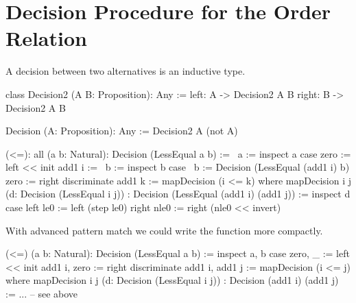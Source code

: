 \vskip 5mm
\section{Decision Procedure for the Order Relation}



A decision between two alternatives is an inductive type.

\begin{alba}
    class Decision2 (A B: Proposition): Any :=
        left: A  -> Decision2 A B
        right: B -> Decision2 A B

    Decision (A: Proposition): Any :=
        Decision2 A (not A)
\end{alba}



\begin{alba}
    (<=): all (a b: Natural): Decision (LessEqual a b) :=
        \ a :=
            inspect a case
                zero :=
                    left << init
                add1 i :=
                    \ b :=
                        inspect b case
                            {\ b := Decision (LessEqual (add1 i) b)}
                            zero :=
                                right discriminate
                            add1 k :=
                                mapDecision (i <= k)
        where
            mapDecision
                {i j} (d: Decision (LessEqual i j))
                : Decision (LessEqual (add1 i) (add1 j))
            :=
                inspect d case
                    left le0 :=
                        left (step le0)
                    right nle0 :=
                        right (nle0 << invert)
\end{alba}

With advanced pattern match we could write the function more compactly.

\begin{alba}
    (<=) (a b: Natural): Decision (LessEqual a b) :=
        inspect
            a, b
        case
            zero, _ :=
                left << init
            add1 i, zero :=
                right discriminate
            add1 i, add1 j :=
                mapDecision (i <= j)
        where
            mapDecision {i j} (d: Decision (LessEqual i j))
                : Decision (add1 i) (add1 j)
            :=
                ... -- see above
\end{alba}





